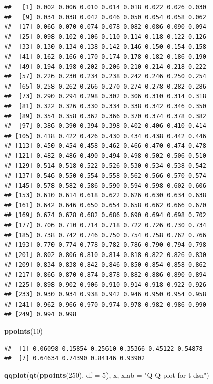 \documentclass[10pt,]{krantz}
\makeatletter
\newenvironment{Shaded}{\begin{snugshade}}{\end{snugshade}}
\newcommand{\KeywordTok}[1]{\textcolor[rgb]{0.13,0.29,0.53}{\textbf{#1}}}
\newcommand{\DataTypeTok}[1]{\textcolor[rgb]{0.13,0.29,0.53}{#1}}
\newcommand{\DecValTok}[1]{\textcolor[rgb]{0.00,0.00,0.81}{#1}}
\newcommand{\StringTok}[1]{\textcolor[rgb]{0.31,0.60,0.02}{#1}}
\newcommand{\NormalTok}[1]{#1}
\newenvironment{kframe}{%
\medskip{}
\setlength{\fboxsep}{.8em}
 \def\at@end@of@kframe{}%
 \ifinner\ifhmode%
  \def\at@end@of@kframe{\end{minipage}}%
  \begin{minipage}{\columnwidth}%
 \fi\fi%
 \def\FrameCommand##1{\hskip\@totalleftmargin \hskip-\fboxsep
 \colorbox{shadecolor}{##1}\hskip-\fboxsep
     \hskip-\linewidth \hskip-\@totalleftmargin \hskip\columnwidth}%
 \MakeFramed {\advance\hsize-\width
   \@totalleftmargin\z@ \linewidth\hsize
   \@setminipage}}%
 {\par\unskip\endMakeFramed%
 \at@end@of@kframe}
\renewenvironment{Shaded}{\begin{kframe}}{\end{kframe}}
\makeatother
\begin{document}
\begin{verbatim}
##   [1] 0.002 0.006 0.010 0.014 0.018 0.022 0.026 0.030
##   [9] 0.034 0.038 0.042 0.046 0.050 0.054 0.058 0.062
##  [17] 0.066 0.070 0.074 0.078 0.082 0.086 0.090 0.094
##  [25] 0.098 0.102 0.106 0.110 0.114 0.118 0.122 0.126
##  [33] 0.130 0.134 0.138 0.142 0.146 0.150 0.154 0.158
##  [41] 0.162 0.166 0.170 0.174 0.178 0.182 0.186 0.190
##  [49] 0.194 0.198 0.202 0.206 0.210 0.214 0.218 0.222
##  [57] 0.226 0.230 0.234 0.238 0.242 0.246 0.250 0.254
##  [65] 0.258 0.262 0.266 0.270 0.274 0.278 0.282 0.286
##  [73] 0.290 0.294 0.298 0.302 0.306 0.310 0.314 0.318
##  [81] 0.322 0.326 0.330 0.334 0.338 0.342 0.346 0.350
##  [89] 0.354 0.358 0.362 0.366 0.370 0.374 0.378 0.382
##  [97] 0.386 0.390 0.394 0.398 0.402 0.406 0.410 0.414
## [105] 0.418 0.422 0.426 0.430 0.434 0.438 0.442 0.446
## [113] 0.450 0.454 0.458 0.462 0.466 0.470 0.474 0.478
## [121] 0.482 0.486 0.490 0.494 0.498 0.502 0.506 0.510
## [129] 0.514 0.518 0.522 0.526 0.530 0.534 0.538 0.542
## [137] 0.546 0.550 0.554 0.558 0.562 0.566 0.570 0.574
## [145] 0.578 0.582 0.586 0.590 0.594 0.598 0.602 0.606
## [153] 0.610 0.614 0.618 0.622 0.626 0.630 0.634 0.638
## [161] 0.642 0.646 0.650 0.654 0.658 0.662 0.666 0.670
## [169] 0.674 0.678 0.682 0.686 0.690 0.694 0.698 0.702
## [177] 0.706 0.710 0.714 0.718 0.722 0.726 0.730 0.734
## [185] 0.738 0.742 0.746 0.750 0.754 0.758 0.762 0.766
## [193] 0.770 0.774 0.778 0.782 0.786 0.790 0.794 0.798
## [201] 0.802 0.806 0.810 0.814 0.818 0.822 0.826 0.830
## [209] 0.834 0.838 0.842 0.846 0.850 0.854 0.858 0.862
## [217] 0.866 0.870 0.874 0.878 0.882 0.886 0.890 0.894
## [225] 0.898 0.902 0.906 0.910 0.914 0.918 0.922 0.926
## [233] 0.930 0.934 0.938 0.942 0.946 0.950 0.954 0.958
## [241] 0.962 0.966 0.970 0.974 0.978 0.982 0.986 0.990
## [249] 0.994 0.998
\end{verbatim}

\begin{Shaded}
\begin{Highlighting}[]
\KeywordTok{ppoints}\NormalTok{(}\DecValTok{10}\NormalTok{)}
\end{Highlighting}
\end{Shaded}

\begin{verbatim}
##  [1] 0.06098 0.15854 0.25610 0.35366 0.45122 0.54878
##  [7] 0.64634 0.74390 0.84146 0.93902
\end{verbatim}

\begin{Shaded}
\begin{Highlighting}[]
\KeywordTok{qqplot}\NormalTok{(}\KeywordTok{qt}\NormalTok{(}\KeywordTok{ppoints}\NormalTok{(}\DecValTok{250}\NormalTok{), }\DataTypeTok{df =} \DecValTok{5}\NormalTok{), x, }\DataTypeTok{xlab =} \StringTok{"Q-Q plot for t dsn"}\NormalTok{)}
\end{Highlighting}
\end{Shaded}
\end{document}
